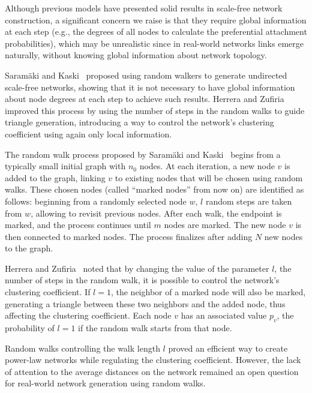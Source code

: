 Although previous models have presented solid results in scale-free network construction, a significant concern we raise is that they require global information at each step (e.g., the degrees of all nodes to calculate the preferential attachment probabilities), which may be unrealistic since in real-world networks links emerge naturally, without knowing global information about network topology. 

Saramäki and Kaski~\cite{Saram_ki_2004} proposed using random walkers to generate undirected scale-free networks, showing that it is not necessary to have global information about node degrees at each step to achieve such results. 
Herrera and Zufiria~\cite{2011Herrera} improved this process by using the number of steps in the random walks to guide triangle generation, introducing a way to control the network's clustering coefficient using again only local information. 





The random walk process proposed by Saramäki and Kaski~\cite{Saram_ki_2004} begins from a typically small initial graph with $n_0$ nodes. At each iteration, a new node $v$ is added to the graph, linking $v$ to existing nodes that will be chosen using random walks. 
These chosen nodes (called ``marked nodes'' from now on) are identified as follows: beginning from a randomly selected node $w$, $l$ random steps are taken from $w$, allowing to revisit previous nodes. After each walk, the endpoint is marked, and the process continues until $m$ nodes are marked. The new node $v$ is then connected to marked nodes. The process finalizes after adding $N$ new nodes to the graph. 

Herrera and Zufiria~\cite{2011Herrera} noted that by changing the value of the parameter $l$, the number of steps in the random walk, it is possible to control the network's clustering coefficient. If $l = 1$, the neighbor of a marked node will also be marked, generating a triangle between these two neighbors and the added node, thus affecting the clustering coefficient. Each node $v$ has an associated value $p_v$, the probability of $l = 1$ if the random walk starts from that node. %

Random walks controlling the walk length $l$ proved an efficient way to create power-law networks while regulating the clustering coefficient. However, the lack of attention to the average distances on the network remained an open question for real-world network generation using random walks.